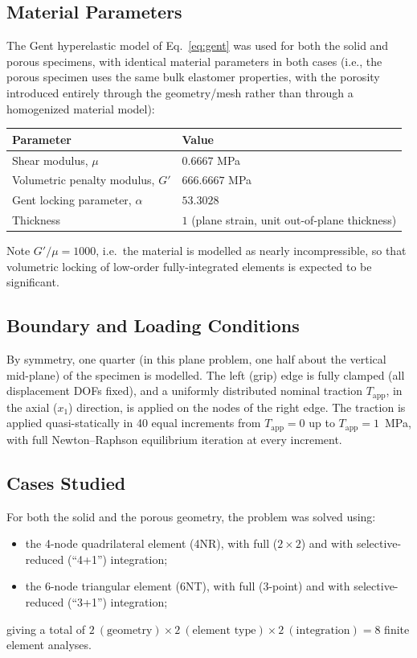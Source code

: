 \documentclass[11pt,a4paper]{article}
\begin{document}
\subsection{Material Parameters}
The Gent hyperelastic model of Eq.~\eqref{eq:gent} was used for both the solid and porous specimens, with
identical material parameters in both cases (i.e., the porous specimen uses the same bulk elastomer
properties, with the porosity introduced entirely through the geometry/mesh rather than through a
homogenized material model):
\begin{center}
\begin{tabular}{ll}
\toprule
Parameter & Value \\
\midrule
Shear modulus, $\mu$ & $0.6667$ MPa \\
Volumetric penalty modulus, $G'$ & $666.6667$ MPa \\
Gent locking parameter, $\alpha$ & $53.3028$ \\
Thickness & $1$ (plane strain, unit out-of-plane thickness) \\
\bottomrule
\end{tabular}
\end{center}
Note $G'/\mu = 1000$, i.e.\ the material is modelled as nearly incompressible, so that volumetric locking
of low-order fully-integrated elements is expected to be significant.

\subsection{Boundary and Loading Conditions}
By symmetry, one quarter (in this plane problem, one half about the vertical mid-plane) of the specimen is
modelled. The left (grip) edge is fully clamped (all displacement DOFs fixed), and a uniformly distributed
nominal traction $T_{\text{app}}$, in the axial ($x_1$) direction, is applied on the nodes of the right
edge. The traction is applied quasi-statically in 40 equal increments from $T_{\text{app}}=0$ up to
$T_{\text{app}} = 1$~MPa, with full Newton--Raphson equilibrium iteration at every increment.

\subsection{Cases Studied}
For both the solid and the porous geometry, the problem was solved using:
\begin{itemize}
    \item the 4-node quadrilateral element (4NR), with full ($2\times2$) and with selective-reduced
    (``4+1'') integration;
    \item the 6-node triangular element (6NT), with full (3-point) and with selective-reduced (``3+1'')
    integration;
\end{itemize}
giving a total of $2\ (\text{geometry}) \times 2\ (\text{element type}) \times 2\ (\text{integration}) = 8$
finite element analyses.
\end{document}
